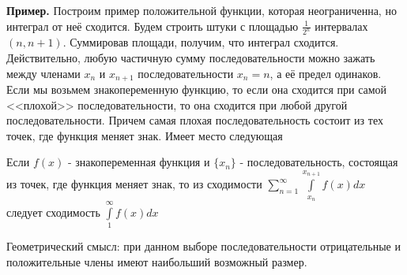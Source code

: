 \textbf{Пример.}
Построим пример положительной функции, которая неограниченна, но интеграл
от неё сходится. Будем строить штуки с площадью $\frac{1}{2^n}$ 
интервалах $(n,n+1)$. Суммировав площади, получим, что интеграл сходится.\\
Действительно, любую частичную сумму последовательности можно 
зажать между членами $x_{n}$ и $x_{n+1}$ последовательности $x_n=n$, а 
её предел одинаков.\\
Если мы возьмем знакопеременную функцию, то если она сходится при самой 
<<плохой>> последовательности, то она сходится при любой другой 
последовательности. Причем самая плохая последовательность состоит из тех 
точек, где функция меняет знак. Имеет место следующая
\begin{theor}
    Если $f(x)$ - знакопеременная функция и  $\{x_n\}$ - последовательность,
    состоящая из точек, где функция меняет знак, то из сходимости
    $\sum\limits_{n=1}^{\infty} \int\limits_{x_n}^{x_{n+1}}f(x)dx$ 
    следует сходимость $\int\limits_{1}^{\infty}f(x)dx$
\end{theor}
Геометрический смысл: при данном выборе последовательности отрицательные и 
положительные члены имеют наибольший возможный размер. 

